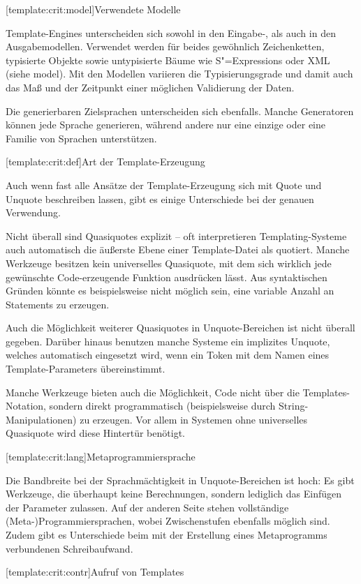 \documentclass[12pt, a4paper, bibgerm]{scrbook}
\newcommand\lsubsection{}
\newcommand\cref{}
\newcommand{\seec}[1]{(siehe \cref{#1})}
\newcommand{\sexps}{S"=Expressions}
\begin{document}
\lsubsection[template:crit:model]{Verwendete Modelle}

Template-Engines unterscheiden sich sowohl in den Eingabe-, als auch in
den Ausgabemodellen. Verwendet werden für beides gewöhnlich
Zeichenketten, typisierte Objekte sowie untypisierte Bäume wie \sexps{}
oder XML \seec{model}. Mit den Modellen variieren die
Typisierungsgrade und damit auch das Maß und der Zeitpunkt einer
möglichen Validierung der Daten.

Die generierbaren Zielsprachen unterscheiden sich ebenfalls. Manche
Generatoren können jede Sprache generieren, während andere nur eine
einzige oder eine Familie von Sprachen unterstützen.

\lsubsection[template:crit:def]{Art der Template-Erzeugung}

Auch wenn fast alle Ansätze der Template-Erzeugung sich mit Quote und
Unquote beschreiben lassen, gibt es einige Unterschiede bei der genauen
Verwendung.

Nicht überall sind Quasiquotes explizit -- oft interpretieren
Templating-Systeme auch automatisch die äußerste Ebene einer Template-Datei als
quotiert. Manche Werkzeuge besitzen kein universelles
Quasiquote, mit dem sich wirklich jede gewünschte Code-erzeugende
Funktion ausdrücken lässt. Aus syntaktischen Gründen könnte es
beispielsweise nicht möglich sein, eine variable Anzahl an Statements zu
erzeugen.

Auch die Möglichkeit weiterer Quasiquotes in
Unquote-Bereichen ist nicht überall gegeben. Darüber hinaus benutzen
manche Systeme ein implizites Unquote, welches automatisch
eingesetzt wird, wenn ein Token mit dem Namen eines Template-Parameters
übereinstimmt.

Manche Werkzeuge bieten auch die Möglichkeit, Code nicht über die
Templates-Notation, sondern direkt programmatisch (beispielsweise durch
String-Manipulationen) zu erzeugen. Vor allem in Systemen ohne
universelles Quasiquote wird diese Hintertür benötigt.

\lsubsection[template:crit:lang]{Metaprogrammiersprache}

Die Bandbreite bei der Sprachmächtigkeit in Unquote-Bereichen ist hoch:
Es gibt Werkzeuge, die überhaupt keine Berechnungen, sondern lediglich
das Einfügen der Parameter zulassen. Auf der anderen Seite stehen
vollständige (Meta-)Programmiersprachen, wobei Zwischenstufen ebenfalls
möglich sind. Zudem gibt es Unterschiede beim mit der Erstellung eines
Metaprogramms verbundenen Schreibaufwand.

\lsubsection[template:crit:contr]{Aufruf von Templates}
\end{document}
